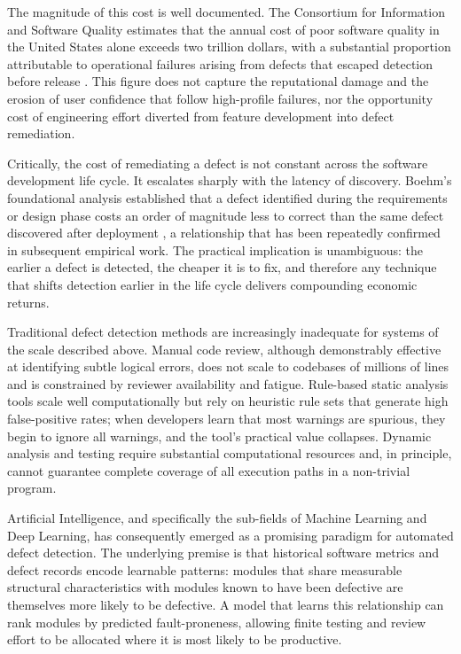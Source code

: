\documentclass[12pt,a4paper,oneside]{report}
\begin{document}
The magnitude of this cost is well documented. The Consortium for Information and Software Quality estimates that the annual cost of poor software quality in the United States alone exceeds two trillion dollars, with a substantial proportion attributable to operational failures arising from defects that escaped detection before release \cite{cisq2022}. This figure does not capture the reputational damage and the erosion of user confidence that follow high-profile failures, nor the opportunity cost of engineering effort diverted from feature development into defect remediation.

Critically, the cost of remediating a defect is not constant across the software development life cycle. It escalates sharply with the latency of discovery. Boehm's foundational analysis established that a defect identified during the requirements or design phase costs an order of magnitude less to correct than the same defect discovered after deployment \cite{boehm1981}, a relationship that has been repeatedly confirmed in subsequent empirical work. The practical implication is unambiguous: the earlier a defect is detected, the cheaper it is to fix, and therefore any technique that shifts detection earlier in the life cycle delivers compounding economic returns.

Traditional defect detection methods are increasingly inadequate for systems of the scale described above. Manual code review, although demonstrably effective at identifying subtle logical errors, does not scale to codebases of millions of lines and is constrained by reviewer availability and fatigue. Rule-based static analysis tools scale well computationally but rely on heuristic rule sets that generate high false-positive rates; when developers learn that most warnings are spurious, they begin to ignore all warnings, and the tool's practical value collapses. Dynamic analysis and testing require substantial computational resources and, in principle, cannot guarantee complete coverage of all execution paths in a non-trivial program.

Artificial Intelligence, and specifically the sub-fields of Machine Learning and Deep Learning, has consequently emerged as a promising paradigm for automated defect detection. The underlying premise is that historical software metrics and defect records encode learnable patterns: modules that share measurable structural characteristics with modules known to have been defective are themselves more likely to be defective. A model that learns this relationship can rank modules by predicted fault-proneness, allowing finite testing and review effort to be allocated where it is most likely to be productive.
\end{document}
